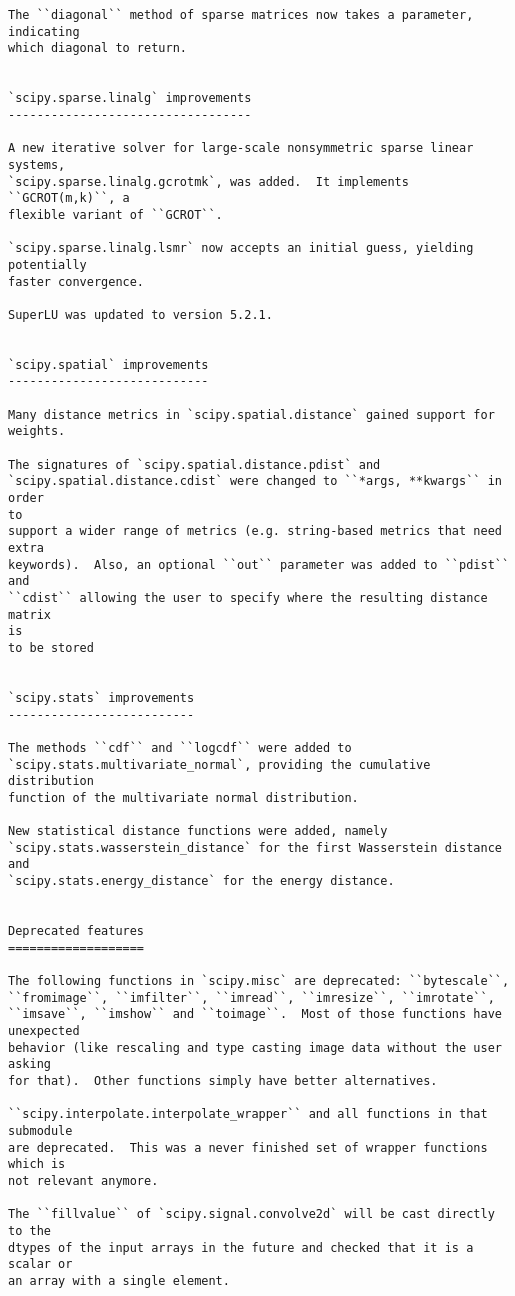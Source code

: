 \begin{verbatim}
The ``diagonal`` method of sparse matrices now takes a parameter, indicating
which diagonal to return.


`scipy.sparse.linalg` improvements
----------------------------------

A new iterative solver for large-scale nonsymmetric sparse linear systems,
`scipy.sparse.linalg.gcrotmk`, was added.  It implements ``GCROT(m,k)``, a
flexible variant of ``GCROT``.

`scipy.sparse.linalg.lsmr` now accepts an initial guess, yielding
potentially
faster convergence.

SuperLU was updated to version 5.2.1.


`scipy.spatial` improvements
----------------------------

Many distance metrics in `scipy.spatial.distance` gained support for
weights.

The signatures of `scipy.spatial.distance.pdist` and
`scipy.spatial.distance.cdist` were changed to ``*args, **kwargs`` in order
to
support a wider range of metrics (e.g. string-based metrics that need extra
keywords).  Also, an optional ``out`` parameter was added to ``pdist`` and
``cdist`` allowing the user to specify where the resulting distance matrix
is
to be stored


`scipy.stats` improvements
--------------------------

The methods ``cdf`` and ``logcdf`` were added to
`scipy.stats.multivariate_normal`, providing the cumulative distribution
function of the multivariate normal distribution.

New statistical distance functions were added, namely
`scipy.stats.wasserstein_distance` for the first Wasserstein distance and
`scipy.stats.energy_distance` for the energy distance.


Deprecated features
===================

The following functions in `scipy.misc` are deprecated: ``bytescale``,
``fromimage``, ``imfilter``, ``imread``, ``imresize``, ``imrotate``,
``imsave``, ``imshow`` and ``toimage``.  Most of those functions have
unexpected
behavior (like rescaling and type casting image data without the user asking
for that).  Other functions simply have better alternatives.

``scipy.interpolate.interpolate_wrapper`` and all functions in that
submodule
are deprecated.  This was a never finished set of wrapper functions which is
not relevant anymore.

The ``fillvalue`` of `scipy.signal.convolve2d` will be cast directly to the
dtypes of the input arrays in the future and checked that it is a scalar or
an array with a single element.


\end{verbatim}
